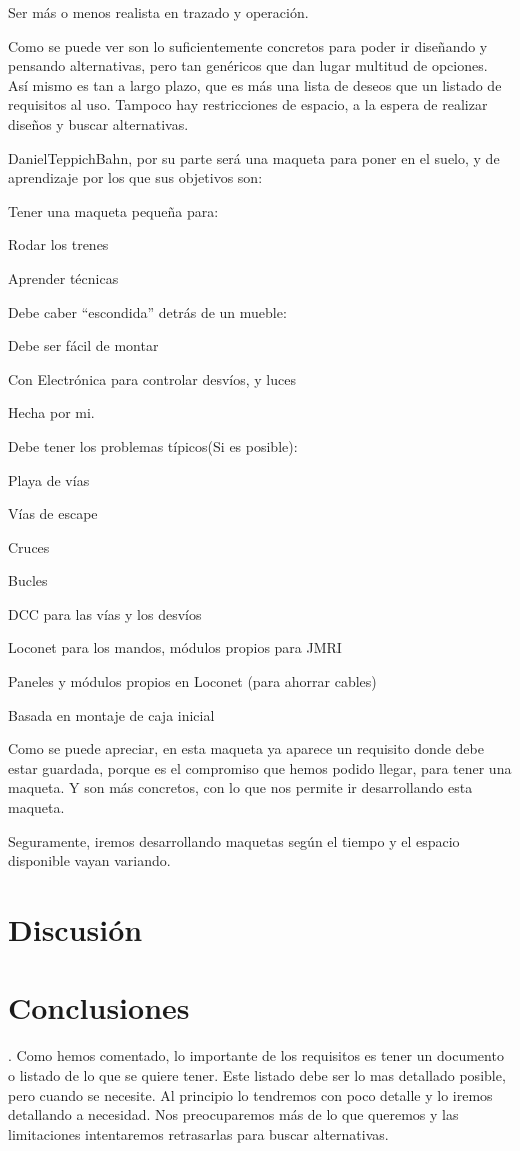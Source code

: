 Ser más o menos realista en trazado y operación. 

 

Como se puede ver son lo suficientemente concretos para poder ir diseñando y pensando alternativas, pero tan genéricos que dan lugar multitud de opciones. Así mismo es tan a largo plazo, que es más una lista de deseos que un listado de requisitos al uso. Tampoco hay restricciones de espacio, a la espera de realizar diseños y buscar alternativas. 

 

DanielTeppichBahn, por su parte será una maqueta para poner en el suelo, y de aprendizaje por los que sus objetivos son: 

Tener una maqueta pequeña para: 

Rodar los trenes 

Aprender técnicas 

Debe caber “escondida” detrás de un mueble: 

Debe ser fácil de montar 

Con Electrónica para controlar desvíos, y luces 

Hecha por mi. 

Debe tener los problemas típicos(Si es posible): 

Playa de vías 

Vías de escape 

Cruces 

Bucles 

DCC para las vías y los desvíos 

Loconet para los mandos, módulos propios para JMRI 

Paneles y módulos propios en Loconet (para ahorrar cables) 

Basada en montaje de caja inicial 

 

Como se puede apreciar, en esta maqueta ya aparece un requisito donde debe estar guardada, porque es el compromiso que hemos podido llegar, para tener una maqueta. Y son más concretos, con lo que nos permite ir desarrollando esta maqueta. 

 

Seguramente, iremos desarrollando maquetas según el tiempo y el espacio disponible vayan variando. 
\section{Discusión}
\section{Conclusiones}.
Como hemos comentado, lo importante de los requisitos es tener un documento o listado de lo que se quiere tener. Este listado debe ser lo mas detallado posible, pero cuando se necesite. Al principio lo tendremos con poco detalle y lo iremos detallando a necesidad. Nos preocuparemos más de lo que queremos y las limitaciones intentaremos retrasarlas para buscar alternativas. 

